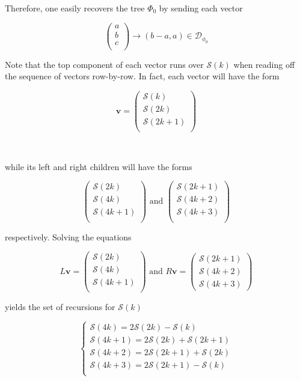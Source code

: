 \documentclass{article}
\begin{document}
Therefore, one easily recovers the tree $\Phi_0$ by sending each vector

$$\begin{pmatrix}
a \\
b \\ 
c \\
\end{pmatrix} \rightarrow 
(b-a, a) \in \mathcal{D}_{\phi_0}$$

Note that the top component of each vector runs over $\mathcal{S}(k)$ when reading off the sequence of vectors row-by-row. In fact, each vector will have the form

$$\mathbf{v} = \begin{pmatrix}
\mathcal{S}(k) \\
\mathcal{S}(2k) \\ 
\mathcal{S}(2k+1) \\
\end{pmatrix}$$

\

while its left and right children will have the forms

$$\begin{pmatrix}
\mathcal{S}(2k) \\
\mathcal{S}(4k) \\ 
\mathcal{S}(4k+1) \\
\end{pmatrix} \text{ and } \begin{pmatrix}
\mathcal{S}(2k+1) \\
\mathcal{S}(4k+2) \\ 
\mathcal{S}(4k+3) \\
\end{pmatrix}$$

respectively. Solving the equations

$$L\mathbf{v} = \begin{pmatrix}
\mathcal{S}(2k) \\
\mathcal{S}(4k) \\ 
\mathcal{S}(4k+1) \\
\end{pmatrix} \text{ and } R\mathbf{v} = \begin{pmatrix}
\mathcal{S}(2k+1) \\
\mathcal{S}(4k+2) \\ 
\mathcal{S}(4k+3)
\end{pmatrix}$$

yields the set of recursions for $\mathcal{S}(k)$

$$
\begin{cases}
\mathcal{S}(4k) = 2\mathcal{S}(2k) - \mathcal{S}(k) \\
\mathcal{S}(4k+1) = 2\mathcal{S}(2k) + \mathcal{S}(2k+1) \\
\mathcal{S}(4k+2) =  2\mathcal{S}(2k+1) + \mathcal{S}(2k) \\
\mathcal{S}(4k+3) =  2\mathcal{S}(2k+1) - \mathcal{S}(k)  \\
\end{cases}
$$
\end{document}

